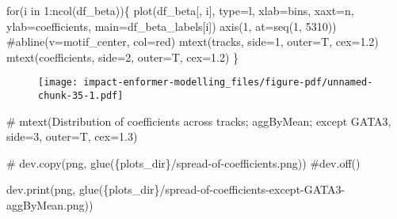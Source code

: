 \documentclass[
  letterpaper,
  DIV=11,
  numbers=noendperiod]{scrartcl}
\newenvironment{Shaded}{\begin{snugshade}}{\end{snugshade}}
\newcommand{\AttributeTok}[1]{\textcolor[rgb]{0.40,0.45,0.13}{#1}}
\newcommand{\CommentTok}[1]{\textcolor[rgb]{0.37,0.37,0.37}{#1}}
\newcommand{\ControlFlowTok}[1]{\textcolor[rgb]{0.00,0.23,0.31}{#1}}
\newcommand{\DecValTok}[1]{\textcolor[rgb]{0.68,0.00,0.00}{#1}}
\newcommand{\FloatTok}[1]{\textcolor[rgb]{0.68,0.00,0.00}{#1}}
\newcommand{\FunctionTok}[1]{\textcolor[rgb]{0.28,0.35,0.67}{#1}}
\newcommand{\NormalTok}[1]{\textcolor[rgb]{0.00,0.23,0.31}{#1}}
\newcommand{\SpecialCharTok}[1]{\textcolor[rgb]{0.37,0.37,0.37}{#1}}
\newcommand{\StringTok}[1]{\textcolor[rgb]{0.13,0.47,0.30}{#1}}
\begin{document}
\begin{Shaded}
\begin{Highlighting}[]
\ControlFlowTok{for}\NormalTok{(i }\ControlFlowTok{in} \DecValTok{1}\SpecialCharTok{:}\FunctionTok{ncol}\NormalTok{(df\_beta))\{}
    \FunctionTok{plot}\NormalTok{(df\_beta[, i], }\AttributeTok{type=}\StringTok{\textquotesingle{}l\textquotesingle{}}\NormalTok{, }\AttributeTok{xlab=}\StringTok{\textquotesingle{}bins\textquotesingle{}}\NormalTok{, }\AttributeTok{xaxt=}\StringTok{\textquotesingle{}n\textquotesingle{}}\NormalTok{, }\AttributeTok{ylab=}\StringTok{\textquotesingle{}coefficients\textquotesingle{}}\NormalTok{, }\AttributeTok{main=}\NormalTok{df\_beta\_labels[i])}
    \FunctionTok{axis}\NormalTok{(}\DecValTok{1}\NormalTok{, }\AttributeTok{at=}\FunctionTok{seq}\NormalTok{(}\DecValTok{1}\NormalTok{, }\DecValTok{5310}\NormalTok{))}
    \CommentTok{\#abline(v=motif\_center, col=\textquotesingle{}red\textquotesingle{})}
    \FunctionTok{mtext}\NormalTok{(}\StringTok{\textquotesingle{}tracks\textquotesingle{}}\NormalTok{, }\AttributeTok{side=}\DecValTok{1}\NormalTok{, }\AttributeTok{outer=}\NormalTok{T, }\AttributeTok{cex=}\FloatTok{1.2}\NormalTok{)}
    \FunctionTok{mtext}\NormalTok{(}\StringTok{\textquotesingle{}coefficients\textquotesingle{}}\NormalTok{, }\AttributeTok{side=}\DecValTok{2}\NormalTok{, }\AttributeTok{outer=}\NormalTok{T, }\AttributeTok{cex=}\FloatTok{1.2}\NormalTok{)}
\NormalTok{\}}
\end{Highlighting}
\end{Shaded}

\begin{figure}[H]

{\centering \texttt{[image: impact-enformer-modelling\_files/figure-pdf/unnamed-chunk-35-1.pdf]}

}

\end{figure}

\begin{Shaded}
\begin{Highlighting}[]
\CommentTok{\# mtext(\textquotesingle{}Distribution of coefficients across tracks; aggByMean; except GATA3\textquotesingle{}, side=3, outer=T, cex=1.3)}

\CommentTok{\# dev.copy(png, glue(\textquotesingle{}\{plots\_dir\}/spread{-}of{-}coefficients.png\textquotesingle{}))}
\CommentTok{\#dev.off()}
\end{Highlighting}
\end{Shaded}

\begin{Shaded}
\begin{Highlighting}[]
\FunctionTok{dev.print}\NormalTok{(png, }\FunctionTok{glue}\NormalTok{(}\StringTok{\textquotesingle{}\{plots\_dir\}/spread{-}of{-}coefficients{-}except{-}GATA3{-}aggByMean.png\textquotesingle{}}\NormalTok{))}
\end{Highlighting}
\end{Shaded}
\end{document}
